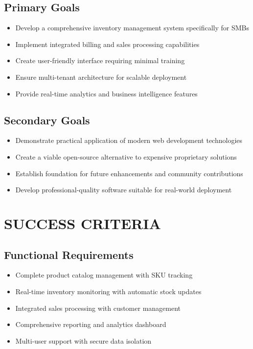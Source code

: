 \subsection{Primary Goals}
\begin{itemize}
\item Develop a comprehensive inventory management system specifically for SMBs
\item Implement integrated billing and sales processing capabilities
\item Create user-friendly interface requiring minimal training
\item Ensure multi-tenant architecture for scalable deployment
\item Provide real-time analytics and business intelligence features
\end{itemize}

\subsection{Secondary Goals}
\begin{itemize}
\item Demonstrate practical application of modern web development technologies
\item Create a viable open-source alternative to expensive proprietary solutions
\item Establish foundation for future enhancements and community contributions
\item Develop professional-quality software suitable for real-world deployment
\end{itemize}

\section{SUCCESS CRITERIA}

\subsection{Functional Requirements}
\begin{itemize}
\item Complete product catalog management with SKU tracking
\item Real-time inventory monitoring with automatic stock updates
\item Integrated sales processing with customer management
\item Comprehensive reporting and analytics dashboard
\item Multi-user support with secure data isolation
\end{itemize}

